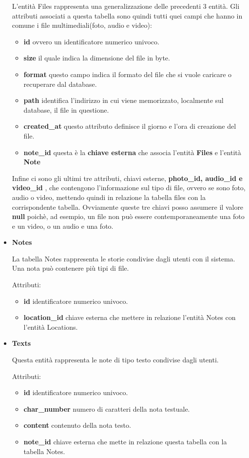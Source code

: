 \begin{itemize}
		L'entità Files rappresenta una generalizzazione delle precedenti 3 entità. Gli attributi associati a questa tabella sono quindi tutti quei campi che hanno in comune i file multimediali(foto, audio e video):
		\begin{itemize}
			\item \textbf{id} ovvero un identificatore numerico univoco.
			\item \textbf{size} il quale indica la dimensione del file in byte.
			\item \textbf{format} questo campo indica il formato del file che si vuole caricare o recuperare dal database.
			\item \textbf{path} identifica l'indirizzo in cui viene memorizzato, localmente sul database, il file in questione.
			\item \textbf{created\_at} questo attributo definisce il giorno e l'ora di creazione del file.
			\item \textbf{note\_id} questa è la \textbf{chiave esterna} che associa l'entità \textbf{Files} e l'entità \textbf{Note}  
		\end{itemize}
	Infine ci sono gli ultimi tre attributi, chiavi esterne, \textbf{photo\_id, audio\_id e video\_id }, che contengono l'informazione sul tipo di file, ovvero se sono foto, audio o video, mettendo quindi in relazione la tabella files con la corrispondente tabella. Ovviamente queste tre chiavi posso assumere il valore \textbf{null} poichè, ad esempio, un file non può essere contemporaneamente una foto e un video, o un audio e una foto. 

	\item \textbf{Notes}
	
		La tabella Notes rappresenta le storie condivise dagli utenti con il sistema. Una nota può contenere più tipi di file.
		
		Attributi: 
		\begin{itemize}
			\item \textbf{id} identificatore numerico univoco.
			\item \textbf{location\_id} chiave esterna che mettere in relazione l'entità Notes con l'entità Locations.
		\end{itemize}
		
	
	\item \textbf{Texts}
	
		Questa entità rappresenta le note di tipo testo condivise dagli utenti. 
		
		Attributi:
		\begin{itemize}
		\item \textbf{id} identificatore numerico univoco.
		\item \textbf{char\_number} numero di caratteri della nota testuale.
		\item \textbf{content} contenuto della nota testo.
		\item \textbf{note\_id} chiave esterna che mette in relazione questa tabella con la tabella Notes.
		\end{itemize}
		

\end{itemize}
